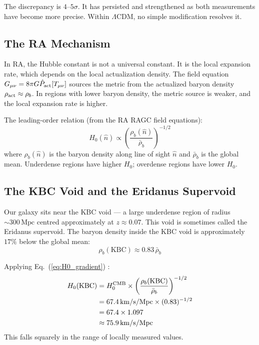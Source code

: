 \documentclass[12pt,a4paper]{article}
\begin{document}
The discrepancy is $4$--$5\sigma$.  It has persisted and strengthened as both measurements have become more precise.  Within $\Lambda$CDM, no simple modification resolves it.

\subsection{The RA Mechanism}

In RA, the Hubble constant is not a universal constant.  It is the local expansion rate, which depends on the local actualization density.  The field equation $G_{\mu\nu}=8\pi G\hat{P}_{\mathrm{act}}[T_{\mu\nu}]$ sources the metric from the actualized baryon density $\rho_{\rm act}\approx\rho_b$.  In regions with lower baryon density, the metric source is weaker, and the local expansion rate is higher.

The leading-order relation (from the RA RAGC field equations):
\begin{equation}
  H_0(\hat{n}) \propto \left(\frac{\rho_b(\hat{n})}{\bar\rho_b}\right)^{-1/2}
  \label{eq:H0_gradient}
\end{equation}
where $\rho_b(\hat{n})$ is the baryon density along line of sight $\hat{n}$ and $\bar\rho_b$ is the global mean.  Underdense regions have higher $H_0$; overdense regions have lower $H_0$.

\subsection{The KBC Void and the Eridanus Supervoid}

Our galaxy sits near the KBC void \cite{Keenan2013} --- a large underdense region of radius $\sim300\,\mathrm{Mpc}$ centred approximately at $z\approx0.07$.  This void is sometimes called the Eridanus supervoid.  The baryon density inside the KBC void is approximately $17\%$ below the global mean:
\begin{equation}
  \rho_b(\mathrm{KBC}) \approx 0.83\,\bar\rho_b
\end{equation}

Applying Eq.~(\ref{eq:H0_gradient}) \statusCV:
\begin{align}
  H_0(\mathrm{KBC}) &= H_0^{\rm CMB}\times\left(\frac{\rho_b(\mathrm{KBC})}{\bar\rho_b}\right)^{-1/2} \\
  &= 67.4\,\mathrm{km/s/Mpc}\times(0.83)^{-1/2} \\
  &= 67.4\times1.097 \\
  &\approx 75.9\,\mathrm{km/s/Mpc}
  \label{eq:H0_KBC}
\end{align}
This falls squarely in the range of locally measured values.
\end{document}
